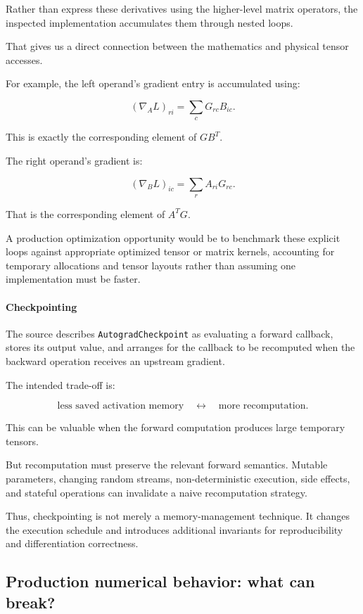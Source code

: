Rather than express these derivatives using the higher-level matrix operators, the inspected implementation accumulates them through nested loops.

That gives us a direct connection between the mathematics and physical tensor accesses.

For example, the left operand's gradient entry is accumulated using:

\[
(\nabla_A L)_{ri} = \sum_cG_{rc}B_{ic}.
\]

This is exactly the corresponding element of \(GB^T\).

The right operand's gradient is:

\[
(\nabla_B L)_{ic} = \sum_rA_{ri}G_{rc}.
\]

That is the corresponding element of \(A^TG\).

A production optimization opportunity would be to benchmark these explicit loops against appropriate optimized tensor or matrix kernels, accounting for temporary allocations and tensor layouts rather than assuming one implementation must be faster.

\paragraph{Checkpointing}\label{02-foundations-ii-ch022-checkpointing}

\hypertarget{02-foundations-ii-ch022-checkpointing}{}

The source describes \texttt{AutogradCheckpoint} as evaluating a forward callback, stores its output value, and arranges for the callback to be recomputed when the backward operation receives an upstream gradient.

The intended trade-off is:

\[
\text{less saved activation memory} \quad\longleftrightarrow\quad \text{more recomputation}.
\]

This can be valuable when the forward computation produces large temporary tensors.

But recomputation must preserve the relevant forward semantics. Mutable parameters, changing random streams, non-deterministic execution, side effects, and stateful operations can invalidate a naive recomputation strategy.

Thus, checkpointing is not merely a memory-management technique. It changes the execution schedule and introduces additional invariants for reproducibility and differentiation correctness.

\subsection{Production numerical behavior: what can break?}\label{02-foundations-ii-ch022-production-numerical-behavior-what-can-break}


